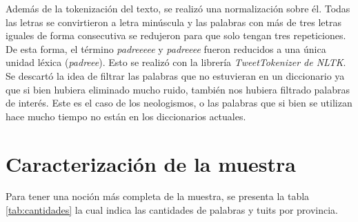 Además de la tokenización del texto, se realizó una normalización sobre él. Todas las letras se convirtieron a letra minúscula y las palabras con más de tres letras iguales de forma consecutiva se redujeron para que solo tengan tres repeticiones. De esta forma, el término \textit{padreeeee} y \textit{padreeee} fueron reducidos a una única unidad léxica (\textit{padreee}). Esto se realizó con la librería \textit{TweetTokenizer de NLTK}. 
Se descartó la idea de filtrar las palabras que no estuvieran en un diccionario ya que si bien hubiera eliminado mucho ruido, también nos hubiera filtrado palabras de interés. Este es el caso de los neologismos, o las palabras que si bien se utilizan hace mucho tiempo no están en los diccionarios actuales.

\section{Caracterización de la muestra}

Para tener una noción más completa de la muestra, se presenta la tabla \ref{tab:cantidades} la cual indica las cantidades de palabras y tuits por provincia.


